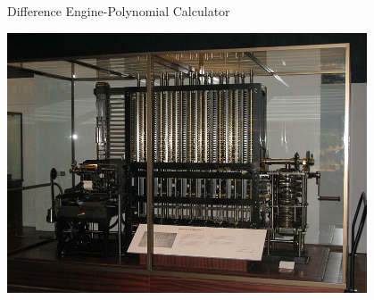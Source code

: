 \documentclass[xcolor={dvipsnames}]{beamer}
\begin{document}
\begin{frame}{Difference Engine-Polynomial Calculator}
	\begin{center}
	\href{http://youtu.be/i_u3hpYMySk}{\includegraphics[width=0.8\textwidth]{Babbage_Difference_Engine}}
	\end{center}
\end{frame}
\end{document}
